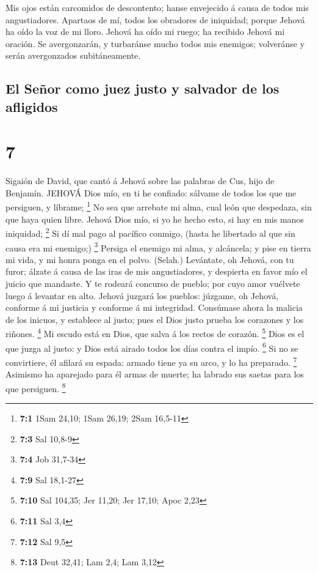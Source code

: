  Mis ojos están carcomidos de descontento; hanse envejecido
á causa de todos mis angustiadores.  Apartaos de mí, todos
los obradores de iniquidad; porque Jehová ha oído la voz de mi lloro.
 Jehová ha oído mi ruego; ha recibido Jehová mi oración.
 Se avergonzarán, y turbaránse mucho todos mis enemigos;
volveránse y serán avergonzados subitáneamente.

\hypertarget{el-seuxf1or-como-juez-justo-y-salvador-de-los-afligidos}{%
\subsection{El Señor como juez justo y salvador de los
afligidos}\label{el-seuxf1or-como-juez-justo-y-salvador-de-los-afligidos}}

\hypertarget{section-6}{%
\section{7}\label{section-6}}

 Sigaión de David, que cantó á Jehová sobre las palabras de
Cus, hijo de Benjamín. JEHOVÁ Dios mío, en ti he confiado: sálvame de
todos los que me persiguen, y líbrame; \footnote{\textbf{7:1} 1Sam
  24,10; 1Sam 26,19; 2Sam 16,5-11}  No sea que arrebate mi
alma, cual león que despedaza, sin que haya quien libre. 
Jehová Dios mío, si yo he hecho esto, si hay en mis manos iniquidad;
\footnote{\textbf{7:3} Sal 10,8-9}  Si dí mal pago al
pacífico conmigo, (hasta he libertado al que sin causa era mi enemigo;)
\footnote{\textbf{7:4} Job 31,7-34}  Persiga el enemigo mi
alma, y alcáncela; y pise en tierra mi vida, y mi honra ponga en el
polvo. (Selah.)  Levántate, oh Jehová, con tu furor; álzate
á causa de las iras de mis angustiadores, y despierta en favor mío el
juicio que mandaste.  Y te rodeará concurso de pueblo; por
cuyo amor vuélvete luego á levantar en alto.  Jehová juzgará
los pueblos: júzgame, oh Jehová, conforme á mi justicia y conforme á mi
integridad.  Consúmase ahora la malicia de los inicuos, y
establece al justo; pues el Dios justo prueba los corazones y los
riñones. \footnote{\textbf{7:9} Sal 18,1-27}  Mi escudo
está en Dios, que salva á los rectos de corazón. \footnote{\textbf{7:10}
  Sal 104,35; Jer 11,20; Jer 17,10; Apoc 2,23}  Dios es el
que juzga al justo: y Dios está airado todos los días contra el impío.
\footnote{\textbf{7:11} Sal 3,4}  Si no se convirtiere, él
afilará su espada: armado tiene ya su arco, y lo ha preparado.
\footnote{\textbf{7:12} Sal 9,5}  Asimismo ha aparejado
para él armas de muerte; ha labrado sus saetas para los que persiguen.
\footnote{\textbf{7:13} Deut 32,41; Lam 2,4; Lam 3,12}

